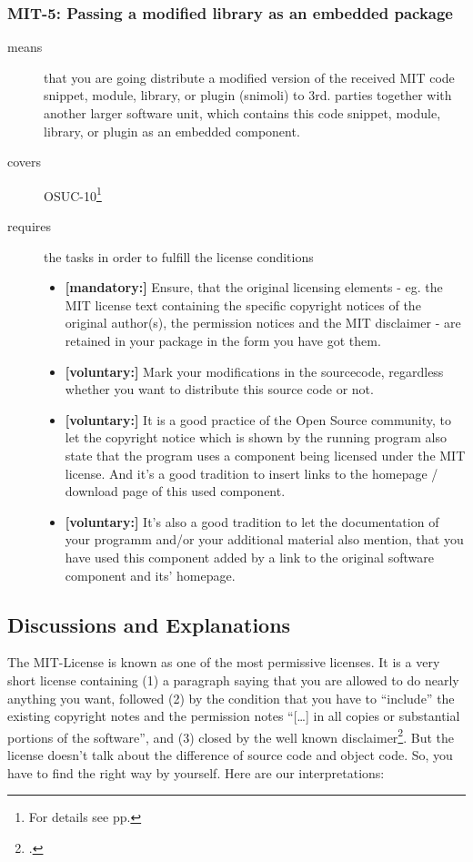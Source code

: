 \subsubsection{MIT-5: Passing a modified library as an embedded package}
\label{OSUC-10-MIT}
\begin{description}
\item[means] that you are going distribute a modified version of the received
MIT code snippet, module, library, or plugin (snimoli) to 3rd. parties together
with another larger software unit, which contains this code snippet, module,
library, or plugin as an embedded component.
\item[covers] OSUC-10\footnote{For details see pp. \pageref{OSUC-10-DEF}}
\item[requires] the tasks in order to fulfill the license conditions
\begin{itemize}
  \item \textbf{[mandatory:]} Ensure, that the original licensing elements - eg.
  the MIT license text containing the specific copyright notices of the original
  author(s), the permission notices and the MIT disclaimer - are retained in
  your package in the form you have got them.
  \item \textbf{[voluntary:]} Mark your modifications in the sourcecode,
  regardless whether you want to distribute this source code or not.
  
  \item \textbf{[voluntary:]} It is a good practice of the Open Source
  community, to let the copyright notice which is shown by the running program
  also state that the program uses a component being licensed under the MIT
  license. And it's a good tradition to insert links to the homepage / download
  page of this used component.

  \item \textbf{[voluntary:]} It's also a good tradition to let the documentation of
  your programm and/or your additional material also mention, that you have used
  this component added by a link to the original software component and its' homepage.
\end{itemize}
\end{description}

\subsection{Discussions and Explanations}

The MIT-License is known as one of the most permissive licenses. It is a very
short license containing (1) a paragraph saying that you are allowed to do
nearly anything you want, followed (2) by the condition that you have to
\enquote{include} the existing copyright notes and the permission notes
\enquote{[\ldots] in all copies or substantial portions of the software}, and
(3) closed by the well known disclaimer\footcite[cf.][\nopage
wp]{MitLicense2012a}. But the license doesn't talk about the difference of
source code and object code. So, you have to find the right way by yourself.
Here are our interpretations:

